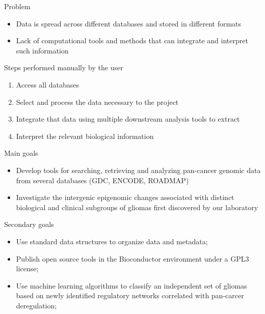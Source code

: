 \documentclass[slidestop,compress,11pt,xcolor=dvipsnames]{beamer}
\begin{document}
\begin{frame}
\begin{alertblock}{Problem}
\begin{itemize}
\item Data is spread across different databases and stored in different formats
\item Lack of computational tools and methods that can integrate and interpret such information
\end{itemize}
\end{alertblock}
\begin{exampleblock}{Steps performed manually by the user}
\begin{enumerate}
\item Access all databases
\item Select and process the data necessary to the project
\item Integrate that data using multiple downstream analysis tools to extract
\item Interpret the relevant biological information
\end{enumerate}
\end{exampleblock}
\end{frame}


\begin{frame}
\begin{block}{Main goals}
\begin{itemize}
\item Develop tools for searching, retrieving and analyzing pan-cancer genomic data from several databases (GDC, ENCODE, ROADMAP)
  \item Investigate the intergenic epigenomic changes associated with distinct biological and clinical subgroups of gliomas first discovered by our laboratory

\end{itemize}

\end{block}

\begin{block}{Secondary goals}
\begin{itemize}
  \item Use standard data structures to organize data and metadata;
  \item Publish open source tools in the Bioconductor environment under a GPL3 license;
  \item Use machine learning algorithms to classify an independent set of gliomas based on newly identified regulatory networks correlated with pan-carcer deregulation;
\end{itemize}

\end{block}


\end{frame}
\end{document}
